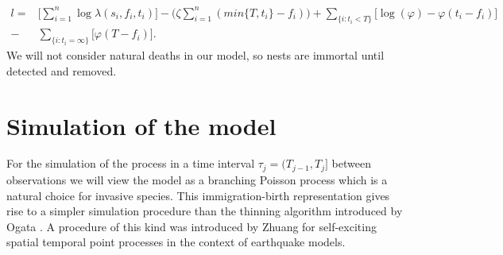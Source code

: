 \documentclass[11pt,a4paper]{article}
\begin{document}
{\color{red}
\begin{equation*}
    \begin{aligned}
        l = & \Bigg[ \sum_{i = 1}^{n} \log \lambda(s_{i},f_{i}, t_{i}) \Bigg] - \bigg(\zeta \sum_{i=1}^{n} (min\{ T, t_i \} - f_i) \bigg)  + \sum_{\{ i : t_{i} < T \} }  \bigg[\log (\varphi) -\varphi(t_{i} - f_{i}) \bigg] \\
        - & \sum_{ \{ i : t_{i} = \infty \} } \bigg[\varphi(T - f_{i}) \bigg].
    \end{aligned}
\end{equation*}
We will not consider natural deaths in our model, so nests are immortal until detected and removed.

{\color{red}\section{Simulation of the model} \label{section:simulationModel}

For the simulation of the process in a time interval $\tau_j = (T_{j-1}, T_j]$ between observations we will view the model as a branching Poisson process \cite{Lewis} which is a natural choice for invasive species. This immigration-birth representation gives rise to a simpler simulation procedure than the thinning algorithm introduced by Ogata \cite{Ogata}. A procedure of this kind was introduced by Zhuang \cite{Zhuang} for self-exciting spatial temporal point processes in the context of earthquake models.

}}
\end{document}
